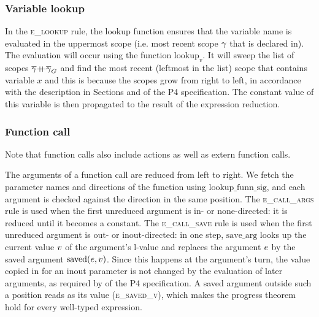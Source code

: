 \documentclass[UTF8]{article}
\begin{document}
\subsubsection*{Variable lookup}
In the \textsc{e\_lookup} rule, the lookup function ensures that the variable name \vn{} is evaluated in the uppermost scope (i.e. most recent scope $\gamma$ that \vn{} is declared in). The evaluation will occur using the function $\mathrm{lookup}_v$. It will sweep the list of scopes $\overline{\gamma} {+}\mspace{-8mu}{+} \overline{\gamma}_G$ and find the most recent (leftmost in the list) scope that contains variable $x$ and this is because the scopes grow from right to left, in accordance with the description in Sections  and  of the P4 specification. The constant value of this variable is then propagated to the result of the expression reduction.

\begin{figure}[ht!]
    \ottusedrule{\ottdruleeXXlookup{}} 
\end{figure}



\subsubsection*{Function call}
Note that function calls also include actions as well as extern function calls.

The arguments of a function call are reduced from left to right. We fetch the parameter names and directions of the function using $\mathrm{lookup\_funn\_sig}$, and each argument is checked against the direction in the same position. The \textsc{e\_call\_args} rule is used when the first unreduced argument is in- or none-directed: it is reduced until it becomes a constant. The \textsc{e\_call\_save} rule is used when the first unreduced argument is out- or inout-directed: in one step, $\mathrm{save\_arg}$ looks up the current value $v$ of the argument's l-value and replaces the argument $e$ by the saved argument $\mathrm{saved}(e, v)$. Since this happens at the argument's turn, the value copied in for an inout parameter is not changed by the evaluation of later arguments, as required by  of the P4 specification. A saved argument outside such a position reads as its value (\textsc{e\_saved\_v}), which makes the progress theorem hold for every well-typed expression.
\end{document}
